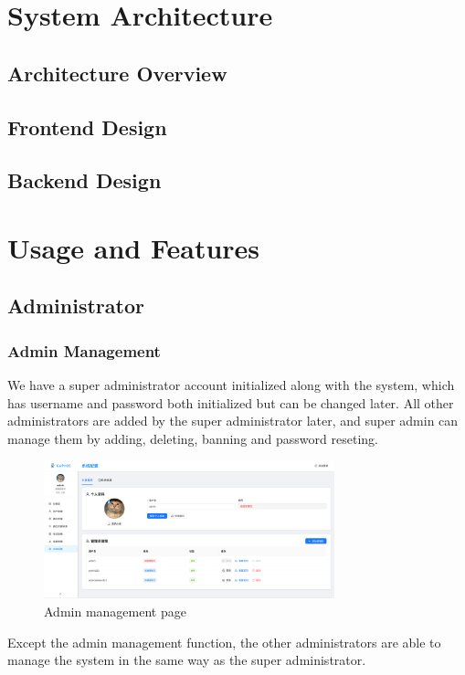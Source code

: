 \documentclass[12pt]{article}
\begin{document}
\section{System Architecture}
\subsection{Architecture Overview}
\subsection{Frontend Design}
\subsection{Backend Design}

\section{Usage and Features}
\subsection{Administrator}
\subsubsection{Admin Management}
We have a super administrator account initialized along with the system, which has username and password both initialized but can be changed later. All other administrators are added by
the super administrator later, and super admin can manage them by adding, deleting, banning and password reseting.
\begin{figure}[H]
    \centering
    \includegraphics[width=0.75\textwidth]{admin/adminmanage.png}
    \caption{Admin management page}
    \label{fig:adminmanage page}
\end{figure}

Except the admin management
function, the other administrators are able to manage the system in the same way as the super administrator.
\end{document}
